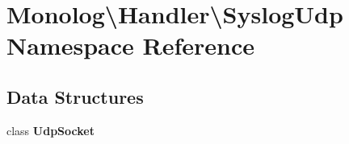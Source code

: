 \section{Monolog\textbackslash{}Handler\textbackslash{}Syslog\+Udp Namespace Reference}
\label{namespace_monolog_1_1_handler_1_1_syslog_udp}
\subsection*{Data Structures}
\begin{DoxyCompactItemize}
\item 
class {\bf Udp\+Socket}
\end{DoxyCompactItemize}
